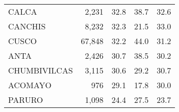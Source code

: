 \begin{tabular}{lrrrr}
	\cellcolor[HTML]{FD6864}CALCA                                      & 2,231                                                                 & 32.8                                                                             & 38.7                                                                        & 32.6                                                                                \\
	\cellcolor[HTML]{FD6864}CANCHIS                                    & 8,232                                                                 & 32.3                                                                             & 21.5                                                                        & 33.0                                                                                \\
	\cellcolor[HTML]{FD6864}CUSCO                                      & 67,848                                                                & 32.2                                                                             & 44.0                                                                        & 31.2                                                                                \\
	\cellcolor[HTML]{FD6864}ANTA                                       & 2,426                                                                 & 30.7                                                                             & 38.5                                                                        & 30.2                                                                                \\
	\cellcolor[HTML]{FD6864}CHUMBIVILCAS                               & 3,115                                                                 & 30.6                                                                             & 29.2                                                                        & 30.7                                                                                \\
	\cellcolor[HTML]{FD6864}ACOMAYO                                    & 976                                                                   & 29.1                                                                             & 17.8                                                                        & 30.0                                                                                \\
	\cellcolor[HTML]{FD6864}PARURO                                     & 1,098                                                                 & 24.4                                                                             & 27.5                                                                        & 23.7                                                                                \\

\end{tabular}
